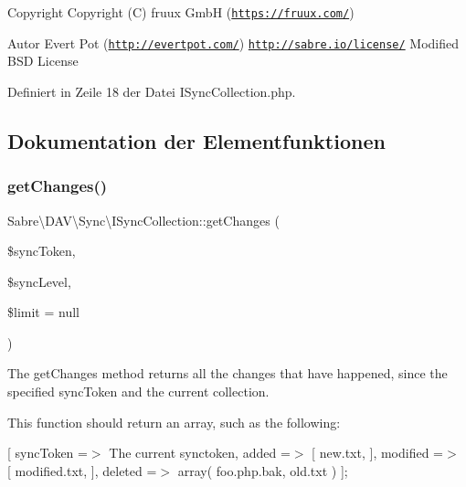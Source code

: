 \begin{DoxyCopyright}{Copyright}
Copyright (C) fruux GmbH (\href{https://fruux.com/}{\tt https\+://fruux.\+com/}) 
\end{DoxyCopyright}
\begin{DoxyAuthor}{Autor}
Evert Pot (\href{http://evertpot.com/}{\tt http\+://evertpot.\+com/})  \href{http://sabre.io/license/}{\tt http\+://sabre.\+io/license/} Modified B\+SD License 
\end{DoxyAuthor}


Definiert in Zeile 18 der Datei I\+Sync\+Collection.\+php.



\subsection{Dokumentation der Elementfunktionen}
\mbox{\label{interface_sabre_1_1_d_a_v_1_1_sync_1_1_i_sync_collection_aa47423825bfcce42d78266f920393aed}} 
\subsubsection{\texorpdfstring{get\+Changes()}{getChanges()}}
{\footnotesize\ttfamily Sabre\textbackslash{}\+D\+A\+V\textbackslash{}\+Sync\textbackslash{}\+I\+Sync\+Collection\+::get\+Changes (\begin{DoxyParamCaption}\item[{}]{\$sync\+Token,  }\item[{}]{\$sync\+Level,  }\item[{}]{\$limit = {\ttfamily null} }\end{DoxyParamCaption})}

The get\+Changes method returns all the changes that have happened, since the specified sync\+Token and the current collection.

This function should return an array, such as the following\+:

\mbox{[} \textquotesingle{}sync\+Token\textquotesingle{} =$>$ \textquotesingle{}The current synctoken\textquotesingle{}, \textquotesingle{}added\textquotesingle{} =$>$ \mbox{[} \textquotesingle{}new.\+txt\textquotesingle{}, \mbox{]}, \textquotesingle{}modified\textquotesingle{} =$>$ \mbox{[} \textquotesingle{}modified.\+txt\textquotesingle{}, \mbox{]}, \textquotesingle{}deleted\textquotesingle{} =$>$ array( \textquotesingle{}foo.\+php.\+bak\textquotesingle{}, \textquotesingle{}old.\+txt\textquotesingle{} ) \mbox{]};

